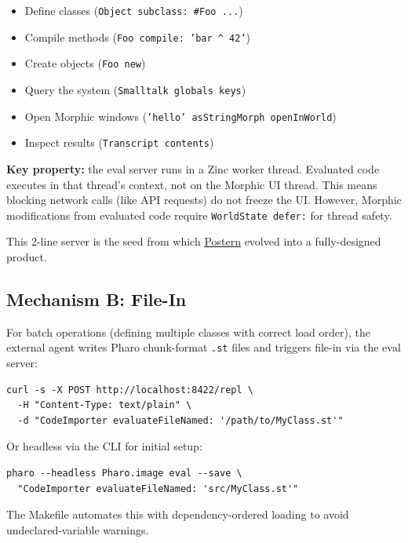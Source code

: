 \documentclass[a4paper,10pt,fleqn]{article}
\begin{document}
\begin{itemize}
  \item Define classes (\texttt{Object subclass: \#Foo ...})
  \item Compile methods (\texttt{Foo compile: 'bar \^{} 42'})
  \item Create objects (\texttt{Foo new})
  \item Query the system (\texttt{Smalltalk globals keys})
  \item Open Morphic windows (\texttt{'hello' asStringMorph openInWorld})
  \item Inspect results (\texttt{Transcript contents})
\end{itemize}

\textbf{Key property:} the eval server runs in a Zinc worker thread.
Evaluated code executes in that thread's context, not on the Morphic UI
thread.  This means blocking network calls (like API requests) do not
freeze the UI.  However, Morphic modifications from evaluated code
require \texttt{WorldState defer:} for thread safety.

This 2-line server is the seed from which
\href{https://github.com/punt-labs/postern}{Postern} evolved into a
fully-designed product.

\subsection{Mechanism B: File-In}

For batch operations (defining multiple classes with correct load
order), the external agent writes Pharo chunk-format \texttt{.st} files
and triggers file-in via the eval server:

\begin{lstlisting}[language={},title={File-in via eval server}]
curl -s -X POST http://localhost:8422/repl \
  -H "Content-Type: text/plain" \
  -d "CodeImporter evaluateFileNamed: '/path/to/MyClass.st'"
\end{lstlisting}

Or headless via the CLI for initial setup:

\begin{lstlisting}[language={},title={Headless file-in}]
pharo --headless Pharo.image eval --save \
  "CodeImporter evaluateFileNamed: 'src/MyClass.st'"
\end{lstlisting}

The Makefile automates this with dependency-ordered loading to avoid
undeclared-variable warnings.
\end{document}
